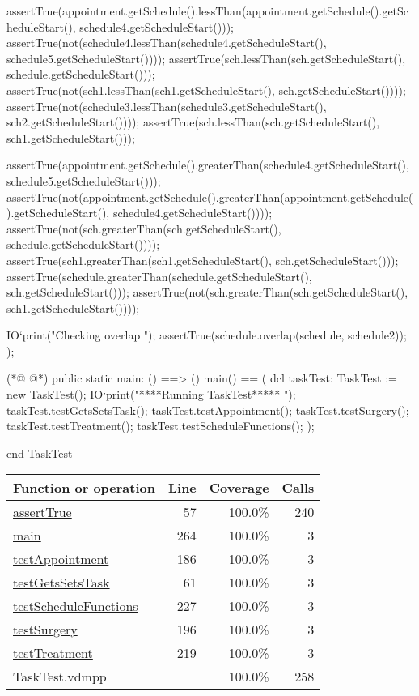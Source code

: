 \begin{vdmpp}[breaklines=true]
   assertTrue(appointment.getSchedule().lessThan(appointment.getSchedule().getScheduleStart(), schedule4.getScheduleStart()));
   assertTrue(not(schedule4.lessThan(schedule4.getScheduleStart(), schedule5.getScheduleStart())));
   assertTrue(sch.lessThan(sch.getScheduleStart(), schedule.getScheduleStart()));
   assertTrue(not(sch1.lessThan(sch1.getScheduleStart(), sch.getScheduleStart())));
   assertTrue(not(schedule3.lessThan(schedule3.getScheduleStart(), sch2.getScheduleStart())));
   assertTrue(sch.lessThan(sch.getScheduleStart(), sch1.getScheduleStart()));
   
   assertTrue(appointment.getSchedule().greaterThan(schedule4.getScheduleStart(), schedule5.getScheduleStart()));
   assertTrue(not(appointment.getSchedule().greaterThan(appointment.getSchedule().getScheduleStart(), schedule4.getScheduleStart())));
   assertTrue(not(sch.greaterThan(sch.getScheduleStart(), schedule.getScheduleStart())));
   assertTrue(sch1.greaterThan(sch1.getScheduleStart(), sch.getScheduleStart()));
   assertTrue(schedule.greaterThan(schedule.getScheduleStart(), sch.getScheduleStart()));
   assertTrue(not(sch.greaterThan(sch.getScheduleStart(), sch1.getScheduleStart())));
   
   IO`print("\n Checking overlap \n");
   assertTrue(schedule.overlap(schedule, schedule2));
  );
  
(*@
\label{main:264}
@*)
  public static main: () ==> ()
   main() == (
    dcl taskTest: TaskTest := new TaskTest();
    IO`print("\n\n *****Running TaskTest***** \n");
    taskTest.testGetsSetsTask();
    taskTest.testAppointment();
    taskTest.testSurgery();
    taskTest.testTreatment();
    taskTest.testScheduleFunctions();
   );

end TaskTest
\end{vdmpp}
\bigskip
\begin{longtable}{|l|r|r|r|}
\hline
Function or operation & Line & Coverage & Calls \\
\hline
\hline
\hyperref[assertTrue:57]{assertTrue} & 57&100.0\% & 240 \\
\hline
\hyperref[main:264]{main} & 264&100.0\% & 3 \\
\hline
\hyperref[testAppointment:186]{testAppointment} & 186&100.0\% & 3 \\
\hline
\hyperref[testGetsSetsTask:61]{testGetsSetsTask} & 61&100.0\% & 3 \\
\hline
\hyperref[testScheduleFunctions:227]{testScheduleFunctions} & 227&100.0\% & 3 \\
\hline
\hyperref[testSurgery:196]{testSurgery} & 196&100.0\% & 3 \\
\hline
\hyperref[testTreatment:219]{testTreatment} & 219&100.0\% & 3 \\
\hline
\hline
TaskTest.vdmpp & & 100.0\% & 258 \\
\hline
\end{longtable}

